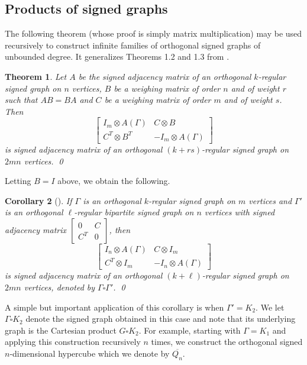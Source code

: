\documentclass[11pt]{article}
\theoremstyle{plain}
\newtheorem{theorem}{Theorem}[section]
\newtheorem{corollary}[theorem]{Corollary}
\theoremstyle{definition}
\begin{document}

\subsection{Products of signed graphs}\label{Sec:Prod}

The following theorem (whose proof is simply matrix multiplication) may be used recursively to construct infinite families of orthogonal  signed graphs of unbounded degree. It generalizes Theorems  1.2 and 1.3 from \cite{Hong}.
\begin{theorem}\label{recur}
Let $A$ be the signed adjacency matrix of an orthogonal $k$-regular signed  graph on $n$ vertices,  $B$ be  a   weighing matrix of order $n$ and  of  weight $r$  such that $AB=BA$  and  $C$ be  a   weighing matrix of order $m$ and  of  weight $s$.
Then
$$\begin{bmatrix}
I_m\otimes A(\Gamma) & C\otimes B\\
C^T\otimes B^T & -I_m\otimes A(\Gamma)
\end{bmatrix}$$
is  signed adjacency matrix of an orthogonal $(k+rs)$-regular signed  graph on $2mn$ vertices. \qed
\end{theorem}


Letting $B=I$ above, we obtain the following.
\begin{corollary}[\cite{Hong}]\label{cartesian}
If $\Gamma$ is an orthogonal  $k$-regular signed  graph on $m$ vertices   and  $\Gamma'$ is an orthogonal $\ell$-regular bipartite signed     graph  on  $n$ vertices with signed adjacency matrix
$\begin{bmatrix}
0 & C\\
C^T & 0
\end{bmatrix}$, then
$$\begin{bmatrix}
I_n\otimes A(\Gamma) & C\otimes I_m\\
C^T\otimes I_m & -I_n\otimes A(\Gamma)
\end{bmatrix}$$
is  signed adjacency matrix of an orthogonal $(k+\ell)$-regular signed  graph on $2mn$ vertices, denoted by $\Gamma\square \Gamma'$. \qed
\end{corollary}

A simple but important application of this corollary is when  $\Gamma'=K_2$.  We let $\Gamma \square K_2$ denote the signed graph obtained in this case and note that its underlying graph is the Cartesian product $G\square K_2$. For example, starting with $\Gamma=K_1$ and applying this construction recursively $n$ times, we construct the orthogonal signed $n$-dimensional hypercube
which we denote by $\overline{Q_n}$. 
\end{document}
